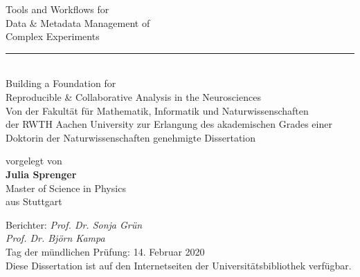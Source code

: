 \documentclass[
    pdftex,
    fontsize=11pt,
    a4paper
   ]{scrbook}
\renewcommand{\title}{\LARGE Tools and Workflows for\\\LARGE Data \& Metadata Management of\\\LARGE Complex Experiments}
\renewcommand{\subtitle}{Building a Foundation for \\Reproducible \& Collaborative Analysis in the Neurosciences}
\newcommand{\thesisdate}{14. Februar 2020}
\newcommand{\thesisauthor}{Julia Sprenger}
\newcommand{\authorbirthplace}{Stuttgart}
\newcommand{\authordegree}{Master of Science in Physics}
\begin{document}
\begin{titlepage}
    \begin{center}
        \Large
        \title\\
        \vspace{1cm}
        \textcolor{black!50}{\rule{3cm}{0.4pt}}\\
        \vspace{1cm}
        \Large\subtitle\\
        \vspace{3cm}
        \large
        Von der Fakultät für Mathematik, Informatik und Naturwissenschaften\\
        der RWTH Aachen University zur Erlangung des akademischen Grades einer
        Doktorin der Naturwissenschaften genehmigte Dissertation
        
        \vspace{1.5cm}
        vorgelegt von\\
        \large{\textbf{\thesisauthor{}}}\\
        \normalsize
        \authordegree\\
        \vspace{0.5cm}
        aus \authorbirthplace\\
        \vspace{1cm}
        \large
    \end{center}
    Berichter: \textit{Prof. Dr. Sonja Grün}\\
    \hphantom{Berichter: }\textit{Prof. Dr. Björn Kampa}\\
    
    \noindent
    Tag der mündlichen Prüfung: \thesisdate\\
    
    \noindent
    Diese Dissertation ist auf den Internetseiten der Universitätsbibliothek verfügbar.
\end{titlepage}
\end{document}
